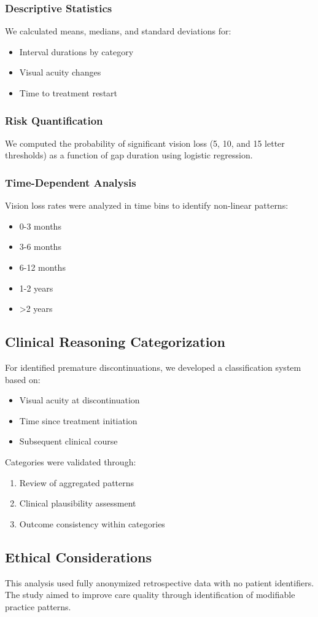 \subsubsection{Descriptive Statistics}
We calculated means, medians, and standard deviations for:
\begin{itemize}
    \item Interval durations by category
    \item Visual acuity changes
    \item Time to treatment restart
\end{itemize}

\subsubsection{Risk Quantification}
We computed the probability of significant vision loss (5, 10, and 15 letter thresholds) as a function of gap duration using logistic regression.

\subsubsection{Time-Dependent Analysis}
Vision loss rates were analyzed in time bins to identify non-linear patterns:
\begin{itemize}
    \item 0-3 months
    \item 3-6 months  
    \item 6-12 months
    \item 1-2 years
    \item >2 years
\end{itemize}

\subsection{Clinical Reasoning Categorization}

For identified premature discontinuations, we developed a classification system based on:
\begin{itemize}
    \item Visual acuity at discontinuation
    \item Time since treatment initiation
    \item Subsequent clinical course
\end{itemize}

Categories were validated through:
\begin{enumerate}
    \item Review of aggregated patterns
    \item Clinical plausibility assessment
    \item Outcome consistency within categories
\end{enumerate}

\subsection{Ethical Considerations}

This analysis used fully anonymized retrospective data with no patient identifiers. The study aimed to improve care quality through identification of modifiable practice patterns.